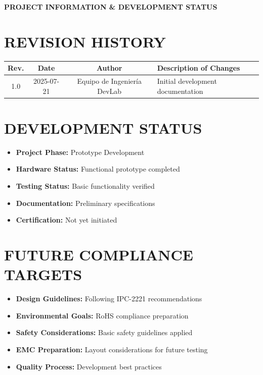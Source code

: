 \documentclass[11pt,a4paper]{article}
\begin{document}
\begin{titlepage}
    \vspace*{2cm}
    
    \begin{center}
    {\Large \textbf{PROJECT INFORMATION \& DEVELOPMENT STATUS}}
    \end{center}
    
    \vspace{1cm}
    
    \section*{REVISION HISTORY}
    \begin{longtable}{|c|c|c|l|}
    \hline
    \textbf{Rev.} & \textbf{Date} & \textbf{Author} & \textbf{Description of Changes} \\
    \hline
    1.0 & 2025-07-21 & Equipo de Ingeniería DevLab & Initial development documentation \\
    \hline
    \end{longtable}
    
    \vspace{1cm}
    
    \section*{DEVELOPMENT STATUS}
    \begin{itemize}
        \item \textbf{Project Phase:} Prototype Development
        \item \textbf{Hardware Status:} Functional prototype completed
        \item \textbf{Testing Status:} Basic functionality verified
        \item \textbf{Documentation:} Preliminary specifications
        \item \textbf{Certification:} Not yet initiated
    \end{itemize}
    
    \vspace{1cm}
    
    \section*{FUTURE COMPLIANCE TARGETS}
    \begin{itemize}
        \item \textbf{Design Guidelines:} Following IPC-2221 recommendations
        \item \textbf{Environmental Goals:} RoHS compliance preparation
        \item \textbf{Safety Considerations:} Basic safety guidelines applied
        \item \textbf{EMC Preparation:} Layout considerations for future testing
        \item \textbf{Quality Process:} Development best practices
    \end{itemize}
    

\end{titlepage}
\end{document}
